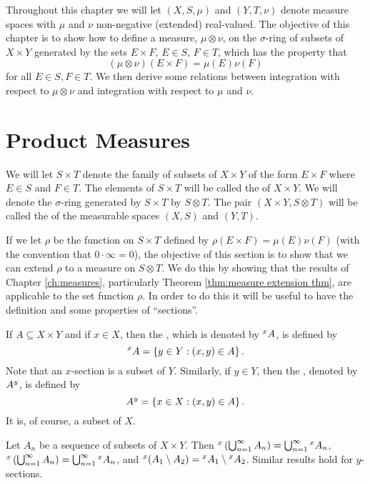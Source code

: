 

Throughout this chapter we will let $(X,S,\mu)$ and $(Y,T,\nu)$ denote measure spaces with $\mu$ and $\nu$ non-negative (extended) real-valued. The objective of this chapter is to show how to define a measure, $\mu\otimes\nu$, on the $\sigma$-ring of subsets of $X\times Y$ generated by the sets $E\times F$, $E\in S$, $F\in T$, which has the property that $$(\mu\otimes\nu)(E\times F)=\mu(E)\nu(F)$$ for all $E\in S,F\in T$. We then derive some relations between integration with respect to $\mu\otimes\nu$ and integration with respect to $\mu$ and $\nu$.

\section{Product Measures}

\begin{definition}
We will let $S\times T$ denote the family of subsets of $X\times Y$ of the form $E\times F$ where $E\in S$ and $F\in T$. The elements of $S\times T$ will be called the  of $X\times Y$. We will denote the $\sigma$-ring generated by $S\times T$ by $S\otimes T$. The pair $(X\times Y,S\otimes T)$ will be called the  of the measurable spaces $(X,S)$ and $(Y,T)$.
\end{definition}

If we let $\rho$ be the function on $S\times T$ defined by $\rho(E\times F)=\mu(E)\nu(F)$ (with the convention that $0\cdot\infty=0$), the objective of this section is to show that we can extend $\rho$ to a measure on $S\otimes T$. We do this by showing that the results of Chapter \ref{ch:measures}, particularly Theorem \ref{thm:measure extension thm}, are applicable to the set function $\rho$. In order to do this it will be useful to have the definition and some properties of ``sections''.

\begin{definition}
If $A\subseteq X\times Y$ and if $x\in X$, then the , which is denoted by $\xsec{A}{x}$, is defined by $$\xsec{A}{x}=\brc{y\in Y:(x, y)\in A}.$$ Note that an $x$-section is a subset of $Y$. Similarly, if $y\in Y$, then the , denoted by $\ysec{A}{y}$, is defined by $$\ysec{A}{y}=\brc{x\in X:(x,y)\in A}.$$ It is, of course, a subset of $X$.
\end{definition}

\begin{proposition}
\label{prop:section preserve union intersection}
Let $A_n$ be a sequence of subsets of $X\times Y$. Then $\xsec{\br{\bigcup_{n=1}^\infty A_n}}{x}=\bigcup_{n=1}^\infty\xsec{A_n}{x}$, $\xsec{\br{\bigcup_{n=1}^\infty A_n}}{x}=\bigcup_{n=1}^\infty\xsec{A_n}{x}$, and $\xsec{(A_1\sd A_2)}{x}=\xsec{A_1}{x}\sd\xsec{A_2}{x}$. Similar results hold for $y$-sections.
\end{proposition}

